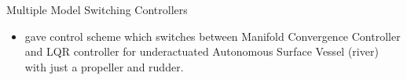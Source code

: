 \documentclass[12pt]{beamer}
\begin{document}
\begin{frame}{Multiple Model Switching Controllers}
\begin{itemize}
    \item \textcite{einstein} gave control scheme which switches between Manifold Convergence Controller and LQR controller for underactuated Autonomous Surface Vessel (river) with just a propeller and rudder.
\end{itemize}

\end{frame}
\end{document}
